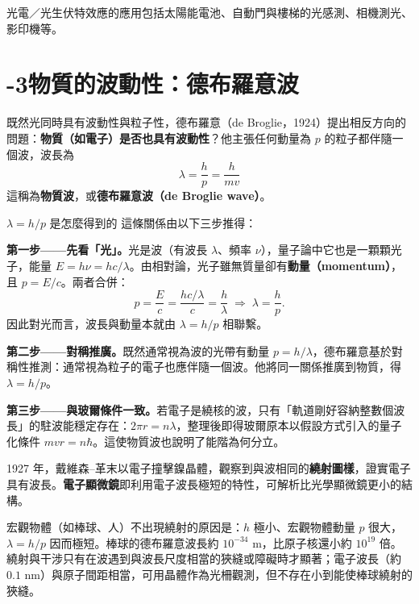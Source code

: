 \documentclass[11pt]{article}
\begin{document}

光電／光生伏特效應的應用包括太陽能電池、自動門與樓梯的光感測、相機測光、影印機等。

\section*{-3\quad 物質的波動性：德布羅意波}

既然光同時具有波動性與粒子性，德布羅意（de Broglie，1924）提出相反方向的問題：\textbf{物質（如電子）是否也具有波動性}？他主張任何動量為 $p$ 的粒子都伴隨一個波，波長為
$$\boxed{\,\lambda=\frac{h}{p}=\frac{h}{mv}\,}$$
這稱為\textbf{物質波}，或\textbf{德布羅意波（de Broglie wave）}。

\begin{補充框}{$\lambda=h/p$ 是怎麼得到的}
這條關係由以下三步推得：

\textbf{第一步——先看「光」。}光是波（有波長 $\lambda$、頻率 $\nu$），量子論中它也是一顆顆光子，能量 $E=h\nu=hc/\lambda$。由相對論，光子雖無質量卻有\textbf{動量（momentum）}，且 $p=E/c$。兩者合併：
$$p=\frac{E}{c}=\frac{hc/\lambda}{c}=\frac{h}{\lambda}\;\Longrightarrow\;\lambda=\frac{h}{p}.$$
因此對光而言，波長與動量本就由 $\lambda=h/p$ 相聯繫。

\textbf{第二步——對稱推廣。}既然通常視為波的光帶有動量 $p=h/\lambda$，德布羅意基於對稱性推測：通常視為粒子的電子也應伴隨一個波。他將同一關係推廣到物質，得 $\lambda=h/p$。

\textbf{第三步——與玻爾條件一致。}若電子是繞核的波，只有「軌道剛好容納整數個波長」的駐波能穩定存在：$2\pi r=n\lambda$，整理後即得玻爾原本以假設方式引入的量子化條件 $mvr=n\hbar$。這使物質波也說明了能階為何分立。
\end{補充框}

1927 年，戴維森–革末以電子撞擊鎳晶體，觀察到與波相同的\textbf{繞射圖樣}，證實電子具有波長。\textbf{電子顯微鏡}即利用電子波長極短的特性，可解析比光學顯微鏡更小的結構。

宏觀物體（如棒球、人）不出現繞射的原因是：$h$ 極小、宏觀物體動量 $p$ 很大，$\lambda=h/p$ 因而極短。棒球的德布羅意波長約 $10^{-34}$ m，比原子核還小約 $10^{19}$ 倍。繞射與干涉只有在波遇到與波長尺度相當的狹縫或障礙時才顯著；電子波長（約 $0.1$ nm）與原子間距相當，可用晶體作為光柵觀測，但不存在小到能使棒球繞射的狹縫。
\end{document}
